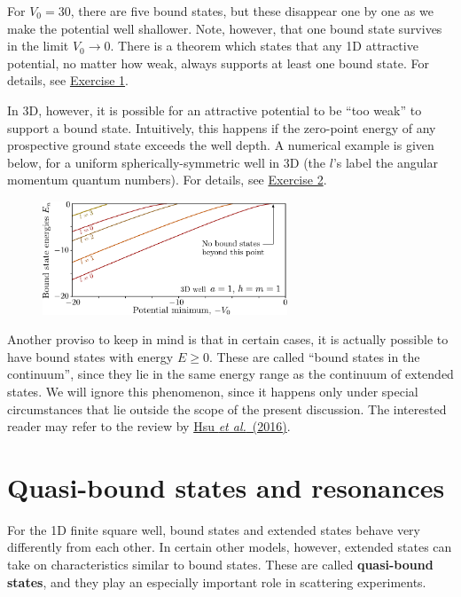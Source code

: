 \documentclass[pra,12pt]{revtex4}
\begin{document}
For $V_0 = 30$, there are five bound states, but these disappear one
by one as we make the potential well shallower.  Note, however, that
one bound state survives in the limit $V_0 \rightarrow 0$.  There is a
theorem which states that any 1D attractive potential, no matter how
weak, always supports at least one bound state.  For details, see
\hyperref[ex:boundstate]{Exercise 1}.

In 3D, however, it is possible for an attractive potential to be ``too
weak'' to support a bound state.  Intuitively, this happens if the
zero-point energy of any prospective ground state exceeds the well
depth.  A numerical example is given below, for a uniform
spherically-symmetric well in 3D (the $l$'s label the angular momentum
quantum numbers).  For details, see
\hyperref[ex:boundstate3d]{Exercise 2}.

\begin{figure}[h]
  \centering\includegraphics[width=0.65\textwidth]{boundstate3d}
\end{figure}

Another proviso to keep in mind is that in certain cases, it is
actually possible to have bound states with energy $E \ge 0$.  These
are called ``bound states in the continuum'', since they lie in the
same energy range as the continuum of extended states.  We will ignore
this phenomenon, since it happens only under special circumstances
that lie outside the scope of the present discussion.  The interested
reader may refer to the review by \hyperref[cite:hsu]{Hsu \textit{et
    al.}~(2016)}.

\section{Quasi-bound states and resonances}

For the 1D finite square well, bound states and extended states behave
very differently from each other.  In certain other models, however,
extended states can take on characteristics similar to bound states.
These are called \textbf{quasi-bound states}, and they play an
especially important role in scattering experiments.
\end{document}
